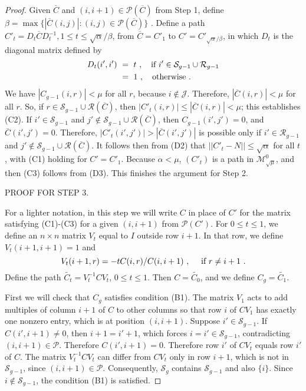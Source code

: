 \documentclass{amsart}
\theoremstyle{definition}
\theoremstyle{remark}
\numberwithin{equation}{section}
\begin{document}
{{\begin{proof}
Given $\overline C$ and $(i,i+1)\in \mathcal P(\overline C)$ 
from Step 1, define 
$\beta = 
 \max \{|\overline C(i,j)|: (i,j)\in \mathcal P(\overline C)\}$ . 
Define a path
$C'_t=D_t\overline{C}D_t^{-1}, 1\leq t \leq \sqrt{\alpha}/\beta$, 
 from $\overline C=C'_1$ to $C'=
 C'_{\sqrt{\alpha}/\beta}$,   
in which $D_t$ is the diagonal matrix defined by 
\begin{align*} 
D_t(i',i') \  & = \ t \ , \quad 
\textnormal{if } i'\in \mathcal S_{g-1}\cup \mathcal R_{g-1} \\ 
& = \  1 \ , \quad 
\textnormal{otherwise .} 
\end{align*} 
We have $|C_{g-1}(i,r)|<\mu$ 
for all $r$, 
because $i\notin \mathcal J$.  
 Therefore, $|\overline C(i,r)|<\mu$ 
for all $r$.  
So, if 
 $r\in \mathcal S_{g-1}\cup \mathcal R(\overline C)$, then 
$|C'_t(i,r)|\leq |\overline C(i,r)|< \mu$; this establishes 
(C2). 
If $i'\in 
\mathcal S_{g-1}$ and 
$j'\notin 
\mathcal S_{g-1}\cup \mathcal R(\overline C)$,
then  $C_{g-1}(i',j') =0$, and $\overline C(i',j')=0$. 
Therefore,  
$|C'_t(i',j')|> |\overline C(i',j')|$ is possible 
only if 
$i'\in \mathcal R_{g-1}$ 
and $j'\notin \mathcal S_{g-1}\cup \mathcal R(\overline C)$. 
It follows then from (D2) that 
$||C'_t-N||\leq \sqrt{\alpha} $ for all $t$, 
with (C1) holding for $C'=C'_1$. Because $\alpha < \mu$, 
$(C'_t)$ is a path in $\mathcal M^0_{\sqrt{\mu}}$, and 
then (C3) follows from (D3). 
This  
 finishes the argument for Step 2.  

PROOF FOR STEP 3. 

For a lighter notation, in this step we will write $C$ in place 
of $C'$ for the matrix satisfying (C1)-(C3) for a given 
$(i,i+1)$ from $ \mathcal P( C')$.  
For $0\leq t\leq 1$, we define an $n\times n$ matrix 
$V_t$ equal to $I$ outside row $i+1$. In that row, 
we define $V_t(i+1,i+1)=1$ and  
\[
V_t(i+1,r)  = -tC(i,r)/C(i,i+1) \ , \quad  
\textnormal{ if } r \neq i+1\ . 
\] 
Define the path $\widetilde{C_t}=V_t^{-1}CV_t$, $0\leq t \leq 1$. 
Then $C=\widetilde{C_0}$,   and we define 
$C_g=\widetilde{C_1}$. 

First we will check that $C_g$ satisfies condition (B1). 
The matrix  $V_1$ acts to add multiples of column $i+1 $ of $C $ to other columns so that 
row $i$ 
of $CV_1$ 
has exactly one 
nonzero entry, which 
 is at position $(i,i+1)$. 
Suppose 
 $i'\in \mathcal S_{g-1}$. If  $C(i',i+1) \neq 0$, 
then $i+1=i'+1$, which forces $i=i'\in \mathcal S_{g-1}$, 
contradicting $(i,i+1)\in \mathcal P$. Therefore  $C(i',i+1) = 0$. 
Therefore  
row $i'$ of $CV_t$ equals row $i'$ of $C$.  
 The matrix 
$V_t^{-1}CV_t$ can differ from $CV_t$ only in row $i+1$, which 
 is not in 
$\mathcal S_{g-1}$, since $(i,i+1)\in \mathcal P$.   Consequently,
 $ \mathcal S_g$ contains $ \mathcal S_{g-1}$ and also $\{i\}$.   Since 
 $i\notin \mathcal S_{g-1}$, 
the condition (B1) is satisfied. 


\end{proof}}}
\end{document}

